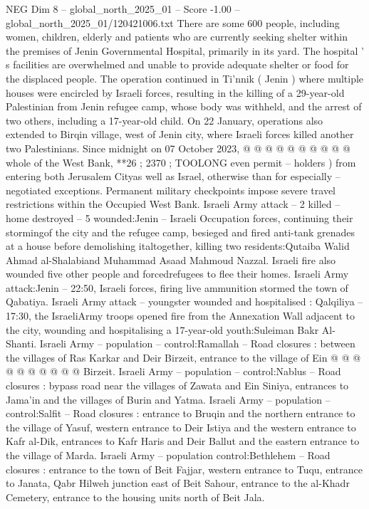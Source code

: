 \begin{textsample}{NEG Dim 8 – global\_north\_2025\_01 – Score -1.00 – global\_north\_2025\_01/120421006.txt}
There are some 600 people, including women, children, elderly and patients who are currently seeking shelter within the premises of Jenin Governmental Hospital, primarily in its yard.
The hospital ' s facilities are overwhelmed and unable to provide adequate shelter or food for the displaced people.
The operation continued in Ti'nnik ( Jenin ) where multiple houses were encircled by Israeli forces, resulting in the killing of a 29-year-old Palestinian from Jenin refugee camp, whose body was withheld, and the arrest of two others, including a 17-year-old child.
On 22 January, operations also extended to Birqin village, west of Jenin city, where Israeli forces killed another two Palestinians.
Since midnight on 07 October 2023, @ @ @ @ @ @ @ @ @ @ whole of the West Bank, **26 ; 2370 ; TOOLONG even permit -- holders ) from entering both Jerusalem Cityas well as Israel, otherwise than for especially -- negotiated exceptions.
Permanent military checkpoints impose severe travel restrictions within the Occupied West Bank.
Israeli Army attack -- 2 killed -- home destroyed -- 5 wounded:Jenin -- Israeli Occupation forces, continuing their stormingof the city and the refugee camp, besieged and fired anti-tank grenades at a house before demolishing italtogether, killing two residents:Qutaiba Walid Ahmad al-Shalabiand Muhammad Asaad Mahmoud Nazzal.
Israeli fire also wounded five other people and forcedrefugees to flee their homes.
Israeli Army attack:Jenin -- 22:50, Israeli forces, firing live ammunition stormed the town of Qabatiya.
Israeli Army attack -- youngster wounded and hospitalised : Qalqiliya -- 17:30, the IsraeliArmy troops opened fire from the Annexation Wall adjacent to the city, wounding and hospitalising a 17-year-old youth:Suleiman Bakr Al-Shanti.
Israeli Army -- population -- control:Ramallah -- Road closures : between the villages of Ras Karkar and Deir Birzeit, entrance to the village of Ein @ @ @ @ @ @ @ @ @ @ Birzeit.
Israeli Army -- population -- control:Nablus -- Road closures : bypass road near the villages of Zawata and Ein Siniya, entrances to Jama'in and the villages of Burin and Yatma.
Israeli Army -- population -- control:Salfit -- Road closures : entrance to Bruqin and the northern entrance to the village of Yasuf, western entrance to Deir Istiya and the western entrance to Kafr al-Dik, entrances to Kafr Haris and Deir Ballut and the eastern entrance to the village of Marda.
Israeli Army -- population control:Bethlehem -- Road closures : entrance to the town of Beit Fajjar, western entrance to Tuqu, entrance to Janata, Qabr Hilweh junction east of Beit Sahour, entrance to the al-Khadr Cemetery, entrance to the housing units north of Beit Jala.

\end{textsample}
